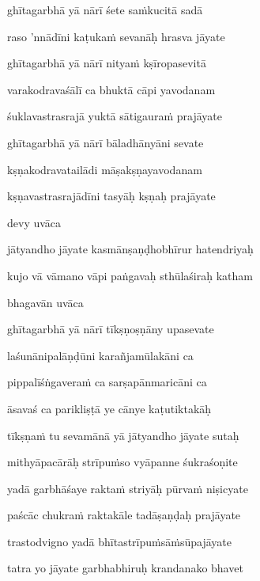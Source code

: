 ghītagarbhā yā nārī śete saṁkucitā sadā\thinspace{\dandab} \dontdisplaylinenum

raso 'nnādīni kaṭukaṁ sevanāḥ hrasva jāyate \veg\dontdisplaylinenum

ghītagarbhā yā nārī nityaṁ kṣīropasevitā\thinspace{\dandab} \dontdisplaylinenum

varakodravaśālī ca bhuktā cāpi yavodanam \veg\dontdisplaylinenum

śuklavastrasrajā yuktā sātigauraṁ prajāyate\thinspace{\dandab} \dontdisplaylinenum

ghītagarbhā yā nārī bāladhānyāni sevate \veg\dontdisplaylinenum

kṣṇakodravatailādi māṣakṣṇayavodanam\thinspace{\dandab} \dontdisplaylinenum

kṣṇavastrasrajādīni tasyāḥ kṣṇaḥ prajāyate \veg\dontdisplaylinenum

devy uvāca~{\dandab}\dontdisplaylinenum 

jātyandho jāyate kasmānṣaṇḍhobhīrur hatendriyaḥ\thinspace{\danda} \dontdisplaylinenum

kujo vā vāmano vāpi paṅgavaḥ sthūlaśiraḥ katham \veg\dontdisplaylinenum

bhagavān uvāca~{\dandab}\dontdisplaylinenum 

ghītagarbhā yā nārī tīkṣṇoṣṇāny upasevate\thinspace{\danda} \dontdisplaylinenum

laśunānipalāṇḍūni karañjamūlakāni ca \veg\dontdisplaylinenum

pippalīśṅgaveraṁ ca sarṣapānmaricāni ca\thinspace{\dandab} \dontdisplaylinenum

āsavaś ca parikliṣṭā ye cānye kaṭutiktakāḥ \veg\dontdisplaylinenum

tīkṣṇaṁ tu sevamānā yā jātyandho jāyate sutaḥ\thinspace{\dandab} \dontdisplaylinenum

mithyāpacārāḥ strīpuṁso vyāpanne śukraśoṇite \danda\dontdisplaylinenum

yadā garbhāśaye raktaṁ striyāḥ pūrvaṁ niṣicyate \veg\dontdisplaylinenum

paścāc chukraṁ raktakāle tadāṣaṇḍaḥ prajāyate\thinspace{\dandab} \dontdisplaylinenum

trastodvigno yadā bhītastrīpuṁsāṁsūpajāyate \veg\dontdisplaylinenum

tatra yo jāyate garbhabhiruḥ krandanako bhavet\thinspace{\dandab} \dontdisplaylinenum

